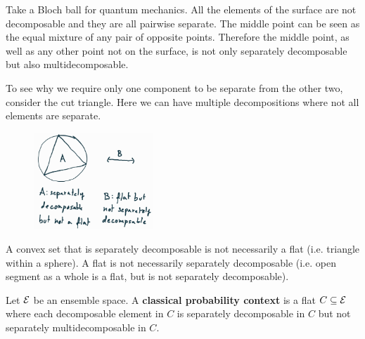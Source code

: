 \begin{mathSection}
\begin{remark}
	Take a Bloch ball for quantum mechanics. All the elements of the surface are not decomposable and they are all pairwise separate. The middle point can be seen as the equal mixture of any pair of opposite points. Therefore the middle point, as well as any other point not on the surface, is not only separately decomposable but also multidecomposable.
	
	To see why we require only one component to be separate from the other two, consider the cut triangle. Here we can have multiple decompositions where not all elements are separate.
\end{remark}

\begin{figure}[H]
	\centering
	\includegraphics[width=0.4\textwidth]{tempimages/SeparableButNotFlat.jpg}
\end{figure}

\begin{remark}
	A convex set that is separately decomposable is not necessarily a flat (i.e. triangle within a sphere). A flat is not necessarily separately decomposable (i.e. open segment as a whole is a flat, but is not separately decomposable).
\end{remark}
\end{mathSection}

\begin{mathSection}
\begin{defn}
	Let $\mathcal{E}$ be an ensemble space. A \textbf{classical probability context} is a flat $C \subseteq \mathcal{E}$ where each decomposable element in $C$ is separately decomposable in $C$ but not separately multidecomposable in $C$.
\end{defn}
\end{mathSection}

